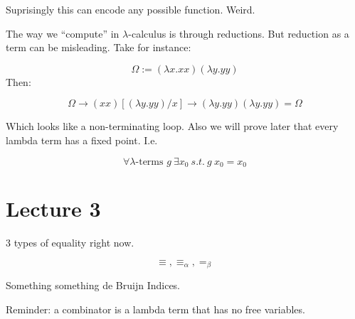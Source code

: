 \documentclass[11pt,a4paper]{article}
\theoremstyle{definition}
\begin{document}
Suprisingly this can encode any possible function. Weird.

The way we ``compute'' in $\lambda$-calculus is through reductions. But reduction as a term can be misleading. Take for instance:

\[
	\Omega := (\lambda x. xx)(\lambda y. yy)
\]
Then:

\[
	\Omega \rightarrow (xx)[(\lambda y. yy)/x] \rightarrow (\lambda y . yy)(\lambda y . yy) = \Omega
\]

Which looks like a non-terminating loop. Also we will prove later that every lambda term has a fixed point. I.e.

\[
	\forall \lambda\text{-terms } g \  \exists x_0 \ s.t. \  g \ x_0 = x_0 
\]	


\section{Lecture 3}

3 types of equality right now. 

\[
	\equiv, \equiv_\alpha, =_\beta
\]

Something something de Bruijn Indices.

Reminder: a combinator is a lambda term that has no free variables. 
\end{document}
